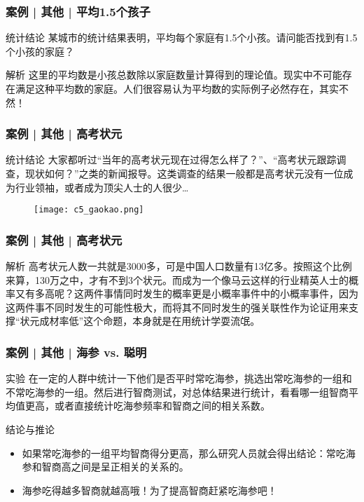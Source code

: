 \begin{frame}
  \frametitle{案例 | 其他 | 平均1.5个孩子}
  \begin{block}{统计结论}
    某城市的统计结果表明，平均每个家庭有1.5个小孩。请问能否找到有1.5个小孩的家庭？
  \end{block}
  \pause
  \begin{block}{解析}
    这里的平均数是小孩总数除以家庭数量计算得到的理论值。现实中不可能存在满足这种平均数的家庭。人们很容易认为平均数的实际例子必然存在，其实不然！
  \end{block}
\end{frame}

\begin{frame}
  \frametitle{案例 | 其他 | 高考状元}
  \begin{block}{统计结论}
    大家都听过“当年的高考状元现在过得怎么样了？”、“高考状元跟踪调查，现状如何？”之类的新闻报导。这类调查的结果一般都是高考状元没有一位成为行业领袖，或者成为顶尖人士的人很少…
    \begin{figure}
      \centering
      \texttt{[image: c5\_gaokao.png]}
    \end{figure}
  \end{block}
\end{frame}

\begin{frame}
  \frametitle{案例 | 其他 | 高考状元}
  \begin{block}{解析}
高考状元人数一共就是3000多，可是中国人口数量有13亿多。按照这个比例来算，130万之中，才有不到3个状元。而成为一个像马云这样的行业精英人士的概率又有多高呢？这两件事情同时发生的概率更是小概率事件中的小概率事件，因为这两件事不同时发生的可能性极大，而将其不同时发生的强关联性作为论证用来支撑“状元成材率低”这个命题，本身就是在用统计学耍流氓。
  \end{block}
\end{frame}

\begin{frame}
  \frametitle{案例 | 其他 | 海参 vs. 聪明}
  \begin{block}{实验}
在一定的人群中统计一下他们是否平时常吃海参，挑选出常吃海参的一组和不常吃海参的一组。然后进行智商测试，对总体结果进行统计，看看哪一组智商平均值更高，或者直接统计吃海参频率和智商之间的相关系数。
  \end{block}
  \pause
  \begin{block}{结论与推论}
    \begin{itemize}
      \item 如果常吃海参的一组平均智商得分更高，那么研究人员就会得出结论：常吃海参和智商高之间是呈正相关的关系的。
      \item 海参吃得越多智商就越高哦！为了提高智商赶紧吃海参吧！
    \end{itemize}
  \end{block}
\end{frame}

